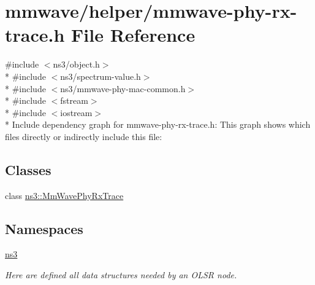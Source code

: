 \hypertarget{mmwave-phy-rx-trace_8h}{}\section{mmwave/helper/mmwave-\/phy-\/rx-\/trace.h File Reference}
\label{mmwave-phy-rx-trace_8h}
{\ttfamily \#include $<$ns3/object.\+h$>$}\\*
{\ttfamily \#include $<$ns3/spectrum-\/value.\+h$>$}\\*
{\ttfamily \#include $<$ns3/mmwave-\/phy-\/mac-\/common.\+h$>$}\\*
{\ttfamily \#include $<$fstream$>$}\\*
{\ttfamily \#include $<$iostream$>$}\\*
Include dependency graph for mmwave-\/phy-\/rx-\/trace.h\+:
This graph shows which files directly or indirectly include this file\+:
\subsection*{Classes}
\begin{DoxyCompactItemize}
\item 
class \hyperlink{classns3_1_1MmWavePhyRxTrace}{ns3\+::\+Mm\+Wave\+Phy\+Rx\+Trace}
\end{DoxyCompactItemize}
\subsection*{Namespaces}
\begin{DoxyCompactItemize}
\item 
 \hyperlink{namespacens3}{ns3}
\begin{DoxyCompactList}\small\item\em Here are defined all data structures needed by an O\+L\+SR node. \end{DoxyCompactList}\end{DoxyCompactItemize}
